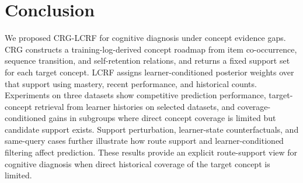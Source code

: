 \documentclass[conference]{IEEEtran}
\begin{document}
\section{Conclusion}
We proposed CRG-LCRF for cognitive diagnosis under concept evidence gaps. CRG constructs a training-log-derived concept roadmap from item co-occurrence, sequence transition, and self-retention relations, and returns a fixed support set for each target concept. LCRF assigns learner-conditioned posterior weights over that support using mastery, recent performance, and historical counts. Experiments on three datasets show competitive prediction performance, target-concept retrieval from learner histories on selected datasets, and coverage-conditioned gains in subgroups where direct concept coverage is limited but candidate support exists. Support perturbation, learner-state counterfactuals, and same-query cases further illustrate how route support and learner-conditioned filtering affect prediction. These results provide an explicit route-support view for cognitive diagnosis when direct historical coverage of the target concept is limited.



\end{document}
